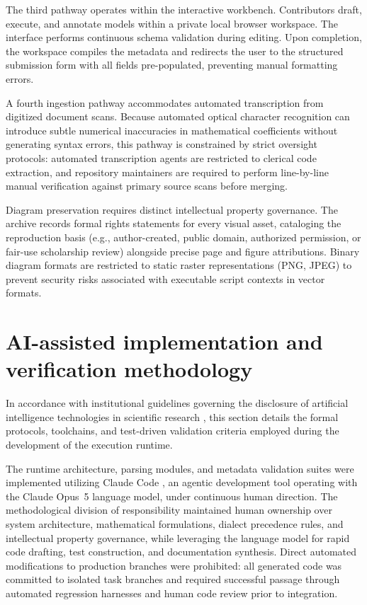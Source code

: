 \documentclass[3p,times,authoryear,twocolumn]{elsarticle}
\begin{document}
The third pathway operates within the interactive workbench. Contributors draft, execute, and annotate models within a private local browser workspace. The interface performs continuous schema validation during editing. Upon completion, the workspace compiles the metadata and redirects the user to the structured submission form with all fields pre-populated, preventing manual formatting errors.

A fourth ingestion pathway accommodates automated transcription from digitized document scans. Because automated optical character recognition can introduce subtle numerical inaccuracies in mathematical coefficients without generating syntax errors, this pathway is constrained by strict oversight protocols: automated transcription agents are restricted to clerical code extraction, and repository maintainers are required to perform line-by-line manual verification against primary source scans before merging.

Diagram preservation requires distinct intellectual property governance. The archive records formal rights statements for every visual asset, cataloging the reproduction basis (e.g., author-created, public domain, authorized permission, or fair-use scholarship review) alongside precise page and figure attributions. Binary diagram formats are restricted to static raster representations (PNG, JPEG) to prevent security risks associated with executable script contexts in vector formats.

\section{AI-assisted implementation and verification methodology}
\label{sec:llm}

In accordance with institutional guidelines governing the disclosure of artificial intelligence technologies in scientific research \citep{elsevierAI}, this section details the formal protocols, toolchains, and test-driven validation criteria employed during the development of the execution runtime.

The runtime architecture, parsing modules, and metadata validation suites were implemented utilizing Claude Code \citep{claudeCode}, an agentic development tool operating with the Claude Opus~5 language model, under continuous human direction. The methodological division of responsibility maintained human ownership over system architecture, mathematical formulations, dialect precedence rules, and intellectual property governance, while leveraging the language model for rapid code drafting, test construction, and documentation synthesis. Direct automated modifications to production branches were prohibited: all generated code was committed to isolated task branches and required successful passage through automated regression harnesses and human code review prior to integration.
\end{document}
